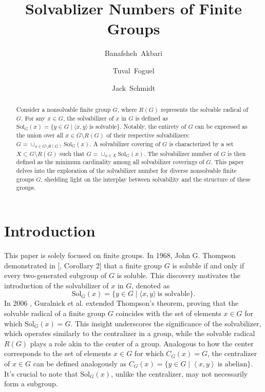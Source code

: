 \documentclass{amsart}
\title[Solvablizer  Numbers]{Solvablizer Numbers of Finite  Groups}
\author[B.~Akbari]{Banafsheh~Akbari}
\author[T.~Foguel]{Tuval~Foguel}
\author[J.~Schmidt]{Jack~Schmidt}
\newcommand{\Solv}{\text{Sol}}
\theoremstyle{definition}
\theoremstyle{remark}
\begin{document}



\begin{abstract}
Consider a nonsolvable finite group $G$, where $R(G)$ represents the solvable radical of $G$. For any $x \in G$, the solvabilizer of $x$ in $G$ is defined as $\Solv_G(x) = \{ y \in G \mid \langle x, y\rangle\ \text{is solvable}\}$. Notably, the entirety of $G$ can be expressed as the union over all $x \in G\setminus R(G)$ of their respective solvabilizers: $G = \cup_{x\in G\setminus R(G)}\Solv_G(x)$. A solvabilizer covering of $G$ is characterized by a set $X\subset G\setminus R(G)$ such that $G = \cup_{x\in X}\Solv_G(x)$. The solvabilizer number of $G$ is then defined as the minimum cardinality among all solvabilizer coverings of $G$. This paper delves into the exploration of the solvabilizer number for diverse nonsolvable finite groups $G$, shedding light on the interplay between solvability and the structure of these groups.
\end{abstract}

\maketitle
\section{Introduction}
This paper is solely focused on finite groups. In 1968, John G. Thompson demonstrated in [\cite{Thompson}, Corollary 2] that a finite group $G$ is soluble if and only if every two-generated subgroup of $G$ is soluble. This discovery motivates the introduction of the solvabilizer of $x$ in $G$, denoted as $$\Solv_G(x) = \{ y\in G\mid \langle x, y\rangle\ \text{is solvable}\}.$$ 
In 2006 \cite{GKPS}, Guralnick et al. extended Thompson's theorem, proving that the solvable radical of a finite group $G$ coincides with the set of elements $x\in G$ for which $\Solv_G(x)=G$. This insight underscores the significance of the solvabilizer, which operates similarly to the centralizer in a group, while the solvable radical $R(G)$ plays a role akin to the center of a group. Analogous to how the center corresponds to the set of elements $x\in G$ for which $C_G(x)=G$, the centralizer of $x\in G$ can be defined analogously as $C_G(x)=\{ y\in G\mid \left\langle x, y\right\rangle\ \text{is abelian}\}$. It's crucial to note that $\Solv_G(x)$, unlike the centralizer, may not necessarily form a subgroup. 
\end{document}
